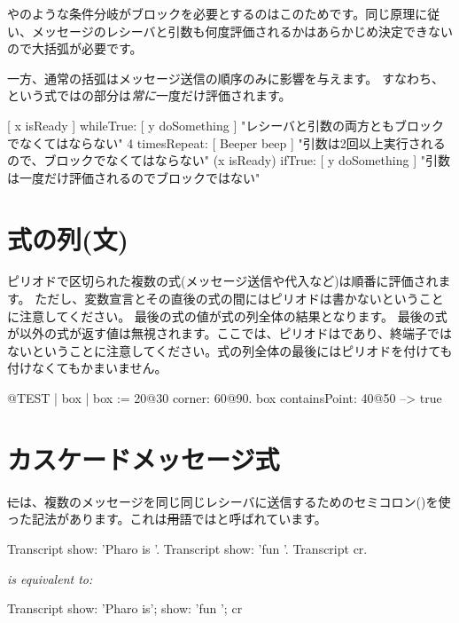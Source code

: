 \documentclass[a4paper,10pt,twoside]{book}
\begin{document}
やのような条件分岐がブロックを必要とするのはこのためです。同じ原理に従い、メッセージのレシーバと引数も何度評価されるかはあらかじめ決定できないので大括弧が必要です。

一方、通常の括弧はメッセージ送信の順序のみに影響を与えます。
すなわち、という式ではの部分は\emph{常に}一度だけ評価されます。

\begin{code}{}
[ x isReady ] whileTrue: [ y doSomething ]   "レシーバと引数の両方ともブロックでなくてはならない"
4 timesRepeat: [ Beeper beep ]                   "引数は2回以上実行されるので、ブロックでなくてはならない"
(x isReady) ifTrue: [ y doSomething ]           "引数は一度だけ評価されるのでブロックではない"
\end{code}

\section{式の列(文)}
ピリオドで区切られた複数の式(\ie メッセージ送信や代入など)は順番に評価されます。
ただし、変数宣言とその直後の式の間にはピリオドは書かないということに注意してください。
最後の式の値が式の列全体の結果となります。
最後の式が以外の式が返す値は無視されます。ここでは、ピリオドはであり、終端子ではないということに注意してください。式の列全体の最後にはピリオドを付けても付けなくてもかまいません。

\begin{code}{@TEST}
| box |
box := 20@30 corner: 60@90.
box containsPoint: 40@50 --> true
\end{code}

\section{カスケードメッセージ式}
\st には、複数のメッセージを同じ同じレシーバに送信するためのセミコロン(\ct{;})を使った記法があります。これは\st 用語ではと呼ばれています。


\begin{minipage}{0.35\textwidth}
\begin{code}{}
Transcript show: 'Pharo is '.
Transcript show: 'fun '.
Transcript cr.
\end{code}
\end{minipage}
\emph{is equivalent to:}
\begin{minipage}{0.35\textwidth}
\begin{code}{}
Transcript        
   show: 'Pharo is';
   show: 'fun ';
   cr
\end{code}
\end{minipage}
\end{document}
